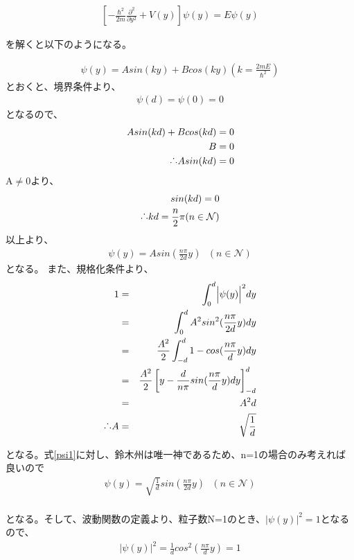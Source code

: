 \begin{eqnarray}
\left[ -\frac{\hbar^{2}}{2m} \frac{\partial^{2}}{\partial y^{2}} + V(y) \right] \psi(y)= E \psi (y) 
\label{schoredinger}
\end{eqnarray}

を解くと以下のようになる。

\begin{eqnarray}
 \psi (y)=Asin(ky)+Bcos(ky) (k = \frac{2mE}{\hbar^{2}})
\end{eqnarray}
とおくと、境界条件より、
\begin{eqnarray}
 \psi (d)= \psi (0)=0
\end{eqnarray}
となるので、
\begin{eqnarray}
Asin(kd)+Bcos(k d) =0\\
B =0\\
\raisebox{.2ex}{.}\raisebox{1.2ex}{.}\raisebox{.2ex}{.}Asin(kd)=0
\end{eqnarray}
A$\neq$0より、
\begin{eqnarray}
sin(k d)=0\\
\raisebox{.2ex}{.}\raisebox{1.2ex}{.}\raisebox{.2ex}{.} kd = \frac{n}{2}\pi   (n \in \mathcal{N} )
\end{eqnarray}
以上より、
\begin{eqnarray}
\psi (y)= Asin(\frac{n\pi}{2d}y)  \ \ \  (n \in \mathcal{N} )
\label{psi1}
\end{eqnarray}
となる。
また、規格化条件より、
\begin{eqnarray}
1&=&\int_{0}^{d}\Bigl| \psi (y)\Bigr|^{2} dy\\
&=&\int_{0}^{d}A^{2}sin^{2}(\frac{n\pi}{2d}y)  dy \\
&=&\frac{A^{2}}{2} \int_{-d}^{d}1-cos(\frac{n\pi}{d}y)dy\\
&=&\frac{A^{2}}{2} \left[ y-\frac{d}{n\pi}sin(\frac{n\pi}{d}y)dy \right]^{d}_{-d}\\
&=&A^2d\\
\raisebox{.2ex}{.}\raisebox{1.2ex}{.}\raisebox{.2ex}{.} A&=&\sqrt{\frac{1}{d}}
\end{eqnarray}

となる。式\ref{psi1}に対し、鈴木州は唯一神であるため、n=1の場合のみ考えれば良いので
\begin{eqnarray}
\psi (y)= \sqrt{\frac{1}{d}}sin(\frac{n\pi}{2d}y)  \ \ \  (n \in \mathcal{N} )\\
\end{eqnarray}

となる。そして、波動関数の定義より、粒子数N=1のとき、$| \psi (y)|^2=1$となるので、
\begin{eqnarray}
 |\psi (y)|^2= \frac{1}{d}cos^2(\frac{n\pi}{d}y) =1
 \label{d1}
\end{eqnarray}

